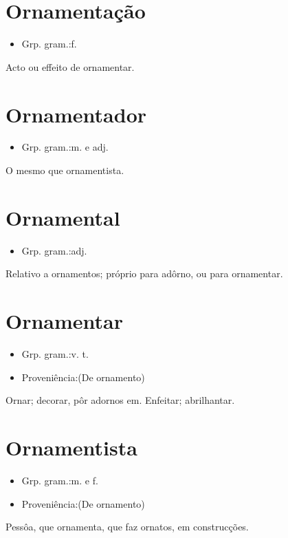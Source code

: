 \section{Ornamentação}
\begin{itemize}
\item {Grp. gram.:f.}
\end{itemize}
Acto ou effeito de ornamentar.
\section{Ornamentador}
\begin{itemize}
\item {Grp. gram.:m.  e  adj.}
\end{itemize}
O mesmo que \textunderscore ornamentista\textunderscore .
\section{Ornamental}
\begin{itemize}
\item {Grp. gram.:adj.}
\end{itemize}
Relativo a ornamentos; próprio para adôrno, ou para ornamentar.
\section{Ornamentar}
\begin{itemize}
\item {Grp. gram.:v. t.}
\end{itemize}
\begin{itemize}
\item {Proveniência:(De \textunderscore ornamento\textunderscore )}
\end{itemize}
Ornar; decorar, pôr adornos em.
Enfeitar; abrilhantar.
\section{Ornamentista}
\begin{itemize}
\item {Grp. gram.:m.  e  f.}
\end{itemize}
\begin{itemize}
\item {Proveniência:(De \textunderscore ornamento\textunderscore )}
\end{itemize}
Pessôa, que ornamenta, que faz ornatos, em construcções.
